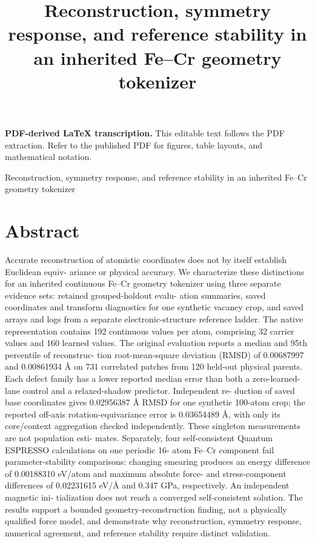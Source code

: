 \documentclass[11pt]{article}
\title{Reconstruction, symmetry response, and reference stability in an inherited Fe–Cr geometry tokenizer}
\author{}
\date{}
\begin{document}
\maketitle
\noindent\textbf{PDF-derived LaTeX transcription.} This editable text follows the PDF extraction. Refer to the published PDF for figures, table layouts, and mathematical notation.


Reconstruction, symmetry response, and reference stability in an
inherited Fe–Cr geometry tokenizer

\section*{Abstract}

Accurate reconstruction of atomistic coordinates does not by itself establish Euclidean equiv-
ariance or physical accuracy. We characterize these distinctions for an inherited continuous
Fe–Cr geometry tokenizer using three separate evidence sets: retained grouped-holdout evalu-
ation summaries, saved coordinates and transform diagnostics for one synthetic vacancy crop,
and saved arrays and logs from a separate electronic-structure reference ladder. The native
representation contains 192 continuous values per atom, comprising 32 carrier values and 160
learned values. The original evaluation reports a median and 95th percentile of reconstruc-
tion root-mean-square deviation (RMSD) of 0.00687997 and 0.00861934 Å on 731 correlated
patches from 120 held-out physical parents. Each defect family has a lower reported median
error than both a zero-learned-lane control and a relaxed-shadow predictor. Independent re-
duction of saved base coordinates gives 0.02956387 Å RMSD for one synthetic 100-atom crop;
the reported off-axis rotation-equivariance error is 0.03654489 Å, with only its core/context
aggregation checked independently. These singleton measurements are not population esti-
mates. Separately, four self-consistent Quantum ESPRESSO calculations on one periodic 16-
atom Fe–Cr component fail parameter-stability comparisons: changing smearing produces an
energy difference of 0.00188310 eV/atom and maximum absolute force- and stress-component
differences of 0.02231615 eV/Å and 0.347 GPa, respectively. An independent magnetic ini-
tialization does not reach a converged self-consistent solution. The results support a bounded
geometry-reconstruction finding, not a physically qualified force model, and demonstrate why
reconstruction, symmetry response, numerical agreement, and reference stability require distinct
validation.
\end{document}
